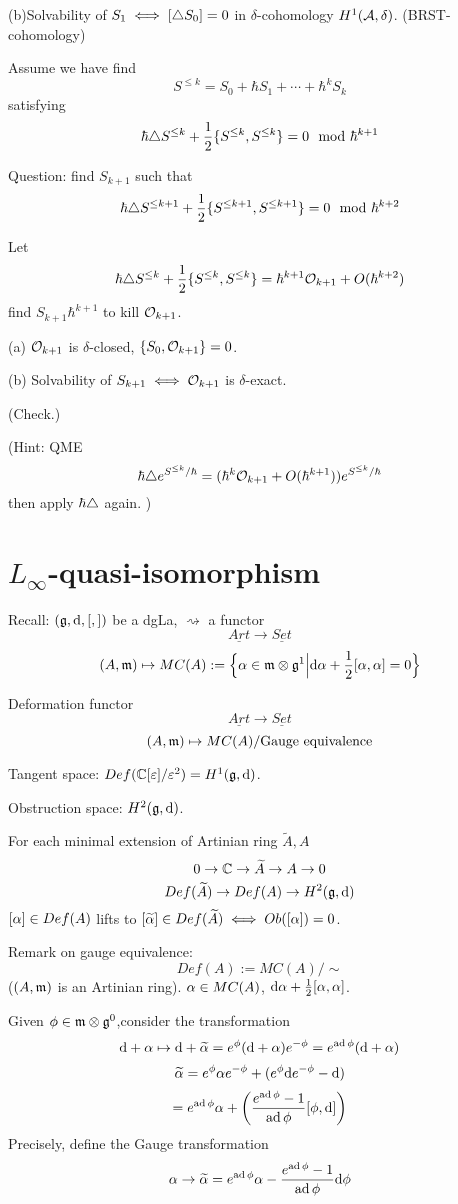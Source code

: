 (b)Solvability of $S_1\iff[\triangle S_0]=0$ in $\delta$-cohomology $H^1(\mathcal{A},\delta)$.
(BRST-cohomology)

Assume we have find
$$S^{\leq k}=S_0+\hbar S_1+\cdots+\hbar^k S_k$$
satisfying
$$\hbar\triangle S^{\leq k}+\frac{1}{2}\{S^{\leq k},S^{\leq k}\}=0\mod\hbar^{k+1}$$

Question: find $S_{k+1}$ such that
$$\hbar\triangle S^{\leq k+1}+
\frac{1}{2}\{S^{\leq k+1},S^{\leq k+1}\}=0\mod\hbar^{k+2}$$

Let
$$\hbar\triangle S^{\leq k}+\frac{1}{2}\{S^{\leq k},S^{\leq k}\}
=\hbar^{k+1}\mathcal{O}_{k+1}+O(\hbar^{k+2})$$
find $S_{k+1}\hbar^{k+1}$ to kill $\mathcal{O}_{k+1}$.

(a) $\mathcal{O}_{k+1}$ is $\delta$-closed, $\{S_0,\mathcal{O}_{k+1}\}=0$.

(b) Solvability of $S_{k+1}\iff \mathcal{O}_{k+1}$ is $\delta$-exact.

(Check.)

(Hint: QME
$$\hbar \triangle e^{S^{\leq k}/\hbar}
=(\hbar^k\mathcal{O}_{k+1}+O(\hbar^{k+1}))e^{S^{\leq k}/\hbar}$$
then apply $\hbar\triangle$ again.
)



\section{$L_\infty$-quasi-isomorphism}
Recall:
$(\mathfrak{g},\mathrm{d},[,])$ be a dgLa, $\rightsquigarrow$ a functor
$$\underline{Art}\to \underline{Set}$$
$$(A,\mathfrak{m})\mapsto MC(A):=
\Big\{ \alpha\in\mathfrak{m}\otimes\mathfrak{g}^1 \Big| \mathrm{d}\alpha+\frac{1}{2}[\alpha,\alpha]=0 \Big\}$$

Deformation functor
$$\underline{Art}\to\underline{Set}$$
$$(A,\mathfrak{m})\mapsto MC(A)/\text{Gauge equivalence}$$

Tangent space: $Def(\mathbb{C}[\varepsilon]/\varepsilon^2)=H^1(\mathfrak{g},\mathrm{d})$.

Obstruction space: $H^2(\mathfrak{g},\mathrm{d})$.

For each minimal extension of Artinian ring $\widetilde{A},A$
$$0\to\mathbb{C}\to\widetilde{A}\to A\to 0$$
$$Def(\widetilde{A})\to Def(A)\to H^2(\mathfrak{g},\mathrm{d})$$
$[\alpha]\in Def(A)$ lifts to $[\widetilde{\alpha}]\in Def(\widetilde{A})
\iff Ob([\alpha])=0$.

Remark on gauge equivalence:
$$Def(A):=MC(A)/\sim$$
($(A,\mathfrak{m})$ is an Artinian ring). $\alpha\in MC(A)$,
$\mathrm{d}\alpha+\frac{1}{2}[\alpha,\alpha]$.

Given $\phi \in \mathfrak{m}\otimes\mathfrak{g}^0$,consider the transformation
$$\mathrm{d}+\alpha\mapsto \mathrm{d}+\widetilde{\alpha}=e^{\phi}(\mathrm{d}+\alpha)e^{-\phi}=e^{\operatorname{ad}\phi}(\mathrm{d}+\alpha)$$
$$\widetilde{\alpha}=e^\phi\alpha e^{-\phi}+(e^\phi\mathrm{d} e^{-\phi}-\mathrm{d})$$
$$
  =e^{\operatorname{ad}\phi}\alpha+
  \left(
    \frac{e^{\operatorname{ad}\phi}-1}{\operatorname{ad}\phi}
    [\phi,\mathrm{d}]
  \right)
$$
Precisely, define the Gauge transformation
$$\alpha\to\widetilde{\alpha}=e^{\operatorname{ad}\phi}\alpha-\frac{e^{\operatorname{ad}\phi}-1}{\operatorname{ad}\phi}\mathrm{d}\phi$$

